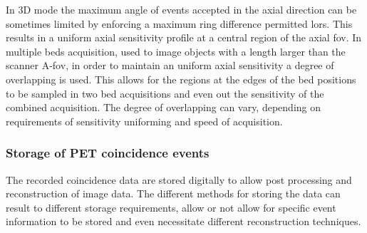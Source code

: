 %
%
In 3D mode the maximum angle of events accepted in the axial direction can be sometimes limited by enforcing a maximum ring difference permitted \glspl{lor}. This results in a uniform axial sensitivity profile at a central region of the axial \gls{fov}.
%
In multiple beds acquisition, used to image objects with a length larger than the scanner A-\gls{fov}, in order to maintain an uniform axial sensitivity a degree of overlapping is used. This allows for the regions at the edges of the bed positions to be sampled in two bed acquisitions and even out the sensitivity of the combined acquisition. The degree of overlapping can vary, depending on requirements of sensitivity uniforming and speed of acquisition.
%
\subsubsection{Storage of PET coincidence events}
The recorded coincidence data are stored digitally to allow post processing and reconstruction of image data.
The different methods for storing the data can result to different storage requirements, allow or not allow for specific event information to be stored and even necessitate different reconstruction techniques. 

